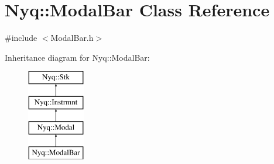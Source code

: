\hypertarget{class_nyq_1_1_modal_bar}{}\section{Nyq\+:\+:Modal\+Bar Class Reference}
\label{class_nyq_1_1_modal_bar}


{\ttfamily \#include $<$Modal\+Bar.\+h$>$}

Inheritance diagram for Nyq\+:\+:Modal\+Bar\+:\begin{figure}[H]
\begin{center}
\leavevmode
\includegraphics[height=4.000000cm]{class_nyq_1_1_modal_bar}
\end{center}
\end{figure}
